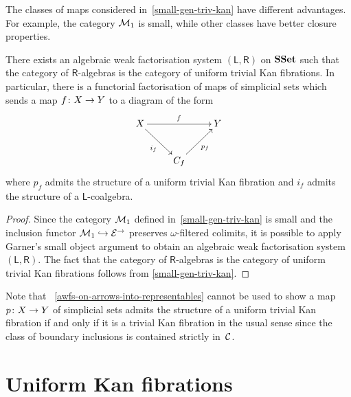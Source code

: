 \documentclass[reqno,10pt,a4paper,oneside]{amsart}
\begin{document}
The classes of maps considered in~\cref{small-gen-triv-kan} have different advantages. For example, 
the category $\cal{M}_1$ is small, while other classes have better closure properties. 




\begin{proposition} There exists an algebraic weak factorisation system $(\mathsf{L}, \mathsf{R})$ on
$\SSet$ such that the category of $\mathsf{R}$-algebras is the category of uniform trivial Kan fibrations. 
In particular, there is a functorial factorisation of maps of simplicial sets which sends
a map $f \co X \to Y$ to a diagram of the form
\[
\xymatrix{ 
X \ar[rr]^f \ar[dr]_{i_f}  & & Y \\
 & C_f \ar[ur]_{p_f} }
 \]
 where $p_f$ admits the structure of  a uniform trivial Kan fibration and 
 $i_f$ admits the structure of a $\mathsf{L}$-coalgebra.
\end{proposition}

\begin{proof} Since the category $\cal{M}_1$ defined in~\cref{small-gen-triv-kan} is small and
the inclusion functor $\cal{M}_1 \hookrightarrow \catE^\to$ preserves $\omega$-filtered colimits, 
it is possible to apply Garner's small object argument to
obtain an algebraic weak factorisation system $(\mathsf{L}, \mathsf{R})$.
The fact that the category of $\mathsf{R}$-algebras is the category of uniform trivial Kan fibrations
 follows from \cref{small-gen-triv-kan}.
 \end{proof} 

Note that ~\cref{awfs-on-arrows-into-representables} cannot be used to show 
a map $p \co X \to Y$ of simplicial sets admits the structure of a uniform trivial Kan fibration if and only if it is a trivial Kan fibration in the usual sense since  the class of boundary inclusions  is contained strictly  in~$\cal{C}$. 




\section{Uniform Kan fibrations}
\label{section-uniform-Kan}
\end{document}
